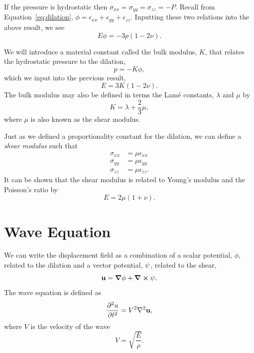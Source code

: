 If the pressure is hydrostatic then $\sigma_{xx} = \sigma_{yy} = \sigma_{zz} = -P$.  Recall from Equation~\ref{eq:dilation}, $\phi = \epsilon_{xx} + \epsilon_{yy} + \epsilon_{zz}$.  Inputting these two relations into the above result, we see
\begin{equation*}
    E \phi = -3 p (1 - 2 \nu) .
\end{equation*}

We will introduce a material constant called the bulk modulus, $K$, that relates the hydrostatic pressure to the dilation,
\begin{equation}
    p = -K \phi,
\end{equation}
which we input into the previous result,
\begin{equation}
    E = 3 K (1 - 2 \nu) .
\end{equation}
The bulk modulus may also be defined in terms the Lam{\'e} constants,
$\lambda$ and $\mu$ by
\begin{equation}
    K = \lambda + \frac{2}{3} \mu ,
\end{equation}
where $\mu$ is also known as the shear modulus.

Just as we defined a proportionality constant for the dilation, we can define a {\it shear modulus} such that
\begin{align}
    \sigma_{xx} & = \mu \epsilon_{xx} \\
    \sigma_{yy} & = \mu \epsilon_{yy} \\
    \sigma_{zz} & = \mu \epsilon_{zz} .
    \label{eq:shear}
\end{align}
It can be shown that the shear modulus is related to Young's modulus and the
Poisson's ratio by
\begin{equation}
    E = 2 \mu (1 + \nu) .
\end{equation}


\section{Wave Equation}

We can write the displacement field as a combination of a scalar potential, $\phi$, related to the dilation and a vector potential, $\vb{\psi}$, related to the shear,
\begin{equation}
    \vb{u} = \grad \phi + \curl \vb{\psi} .
\end{equation}
The wave equation is defined as
\begin{equation}
    \pdv[2]{u}{t} = V^2 \nabla^2 \vb{u},
\end{equation}
where $V$ is the velocity of the wave
\begin{equation}
    V = \sqrt{\frac{E}{\rho}}.
\end{equation}

